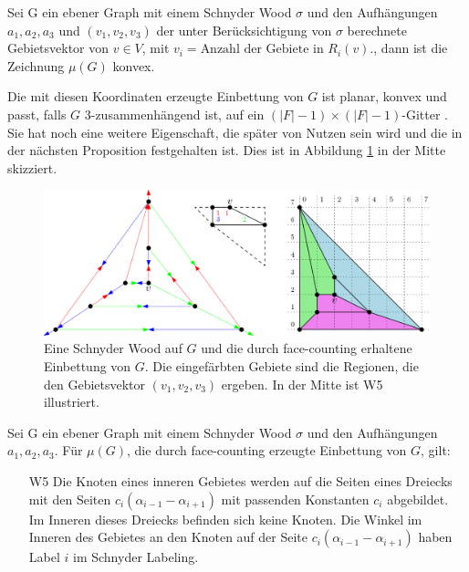 \begin{theorem}
Sei G ein ebener Graph mit einem Schnyder Wood $\sigma$ und den Aufhängungen $a_1,a_2,a_3$ und $(v_1,v_2,v_3)$ der unter Berücksichtigung von $\sigma$ berechnete Gebietsvektor von $v \in V$, mit $ v_i = \text{Anzahl der Gebiete in }R_i(v).$, dann ist die Zeichnung $\mu(G)$ konvex.
\end{theorem}

Die mit diesen Koordinaten erzeugte Einbettung von $G$ ist planar, konvex und passt, falls $G$ 3-zusammenhängend ist, auf ein $(|F|-1)\times(|F|-1)$-Gitter \cite[Korollar 2.8]{felsner12}. Sie hat noch eine weitere Eigenschaft, die später von Nutzen sein wird und die in der nächsten Proposition festgehalten ist.  Dies ist in Abbildung \ref{face_counting} in der Mitte skizziert.

\begin{figure}
	\centering
  \includegraphics[width=1\textwidth]{face_counting.png}
	\caption{Eine Schnyder Wood auf $G$ und die durch face-counting erhaltene Einbettung von $G$. Die eingefärbten Gebiete sind die Regionen, die den Gebietsvektor $(v_1,v_2,v_3)$ ergeben. In der Mitte ist W5 illustriert.}
	\label{face_counting}
\end{figure}

\begin{proposition}\label{w5}
Sei G ein ebener Graph mit einem Schnyder Wood $\sigma$ und den Aufhängungen $a_1,a_2,a_3$. Für $\mu(G)$, die durch face-counting erzeugte Einbettung von $G$, gilt:
\begin{itemize}
\item [W5] Die Knoten eines inneren Gebietes werden auf die Seiten eines Dreiecks mit den Seiten $c_i(\alpha_{i-1}-\alpha_{i+1})$ mit passenden Konstanten $c_i$ abgebildet. Im Inneren dieses Dreiecks befinden sich keine Knoten. Die Winkel im Inneren des Gebietes an den Knoten auf der Seite $c_i(\alpha_{i-1}-\alpha_{i+1})$ haben Label $i$ im Schnyder Labeling.
\end{itemize}
\end{proposition}

